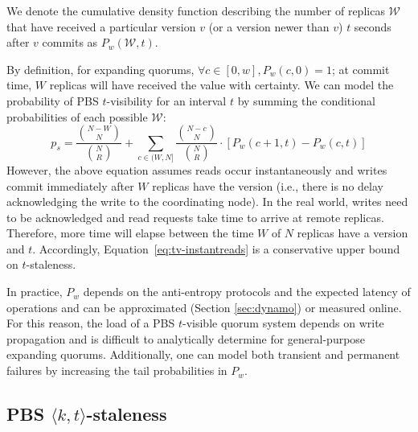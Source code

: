 \documentclass{vldb}
\begin{document}
We denote the cumulative density function describing the number of
replicas $\mathcal{W}$ that have received a particular version $v$ (or
a version newer than $v$) $t$ seconds after $v$ commits as
$P_w(\mathcal{W}, t)$.

By definition, for expanding quorums, $\forall c \in [0, w], P_w(c,0)
= 1$; at commit time, $W$ replicas will have received the value with
certainty.  We can model the probability of PBS $t$-visibility for an
interval $t$ by summing the conditional probabilities of each possible
$\mathcal{W}$:
\begin{equation}
\label{eq:tv-instantreads}
p_{s} = \frac{{N-W \choose N}}{{N \choose R}}+\sum_{c\in(W, N]} \frac{{N-c \choose N}}{{N \choose R}}\cdot [P_w(c+1, t)-P_w(c,t)]
\end{equation}
However, the above equation assumes reads occur instantaneously and
writes commit immediately after $W$ replicas have the version (i.e.,
there is no delay acknowledging the write to the coordinating node).
In the real world, writes need to be acknowledged and read requests
take time to arrive at remote replicas.  Therefore, more time will elapse
between the time $W$ of $N$ replicas have a version and $t$.
Accordingly, Equation~\ref{eq:tv-instantreads} is a conservative upper
bound on $t$-staleness.

In practice, $P_w$ depends on the anti-entropy protocols and the
expected latency of operations and can be approximated (Section
\ref{sec:dynamo}) or measured online.  For this reason, the load of a
PBS $t$-visible quorum system depends on write propagation and is
difficult to analytically determine for general-purpose expanding
quorums.  Additionally, one can model both transient and permanent
failures by increasing the tail probabilities in $P_w$.


\subsection{PBS $\langle k, t \rangle$-staleness}
\end{document}
